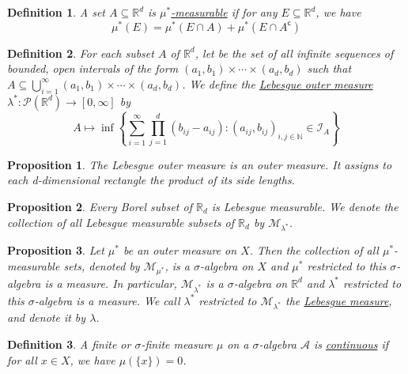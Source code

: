 \documentclass[12pt]{article}    %
\newtheorem{definition}{Definition}[subsection]
\newtheorem{proposition}{Proposition}[subsection]
\begin{document}
\begin{definition}
	A set $A \subseteq \mathbb{R}^d$ is \underline{$\mu^*$-measurable} if for any $E \subseteq \mathbb{R}^d$, we have
	\begin{equation*}
		\mu^*(E) = \mu^*(E \cap A) + \mu^*(E \cap A^\mathsf{c})
	\end{equation*}
\end{definition}

\begin{definition}
	For each subset $A$ of $\mathbb{R}^d$, let be the set of all infinite sequences of bounded, open intervals of the form $(a_1, b_1) \times \cdots \times (a_d, b_d)$ such that $A \subseteq \bigcup_{i=1}^\infty (a_1, b_1) \times \cdots \times (a_d, b_d)$. We
	define the \underline{Lebesgue outer measure} $\lambda^*:\mathcal{P}(\mathbb{R}^d) \to [0, \infty]$ by
	$$ A \mapsto \inf\left\{\sum_{i=1}^\infty \prod_{j=1}^d (b_{ij} - a_{ij}): (a_{ij}, b_{ij})_{i,j \in \mathbb{N}} \in \mathcal{I}_A\right\}$$
\end{definition}

\begin{proposition}
	The Lebesgue outer measure is an outer measure. It assigns to each d-dimensional rectangle the product of its side lengths.
\end{proposition}

\begin{proposition}
	Every Borel subset of $\mathbb{R}_d$ is Lebesgue measurable. We denote the collection of all Lebesgue measurable subsets of $\mathbb{R}_d$ by $\mathcal{M}_{\lambda^*}$.
\end{proposition}


\begin{proposition}
	Let $\mu^*$ be an outer measure on $X$. Then the collection of all $\mu^*$-measurable sets, denoted by $\mathcal{M}_{\mu^*}$, is a $\sigma$-algebra on $X$ and $\mu^*$ restricted to this $\sigma$-algebra is a measure.
	In particular, $\mathcal{M}_{\lambda^*}$ is a $\sigma$-algebra on $\mathbb{R}^d$ and $\lambda^*$ restricted to this $\sigma$-algebra is a measure. We call $\lambda^*$ restricted to $\mathcal{M}_{\lambda^*}$ the \underline{Lebesgue measure}, and denote it by $\lambda$.
\end{proposition}

\begin{definition}
	A finite or $\sigma$-finite measure $\mu$ on a $\sigma$-algebra $\mathcal{A}$ is \underline{continuous} if for all $x\in X$, we have $\mu(\{x\}) = 0$.
\end{definition}
\end{document}
